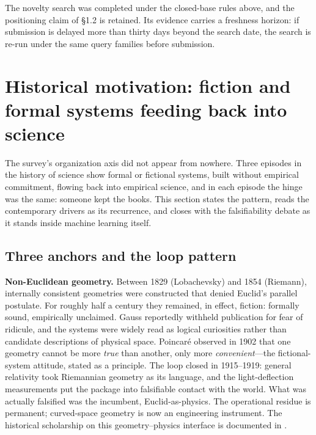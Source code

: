 \documentclass[11pt,a4paper]{article}
\begin{document}
The novelty search was completed under the closed-base rules above, and the positioning claim of §1.2 is retained. Its evidence carries a freshness horizon: if submission is delayed more than thirty days beyond the search date, the search is re-run under the same query families before submission.

\section{Historical motivation: fiction and formal systems feeding back into science}

The survey's organization axis did not appear from nowhere. Three episodes in the history of science show formal or fictional systems, built without empirical commitment, flowing back into empirical science, and in each episode the hinge was the same: someone kept the books. This section states the pattern, reads the contemporary drivers as its recurrence, and closes with the falsifiability debate as it stands inside machine learning itself.

\subsection{Three anchors and the loop pattern}

\textbf{Non-Euclidean geometry.} Between 1829 (Lobachevsky) and 1854 (Riemann), internally consistent geometries were constructed that denied Euclid's parallel postulate. For roughly half a century they remained, in effect, fiction: formally sound, empirically unclaimed. Gauss reportedly withheld publication for fear of ridicule, and the systems were widely read as logical curiosities rather than candidate descriptions of physical space. Poincaré observed in 1902 that one geometry cannot be more \textit{true} than another, only more \textit{convenient}—the fictional-system attitude, stated as a principle. The loop closed in 1915–1919: general relativity took Riemannian geometry as its language, and the light-deflection measurements put the package into falsifiable contact with the world. What was actually falsified was the incumbent, Euclid-as-physics. The operational residue is permanent; curved-space geometry is now an engineering instrument. The historical scholarship on this geometry–physics interface is documented in \cite{key18}.
\end{document}
